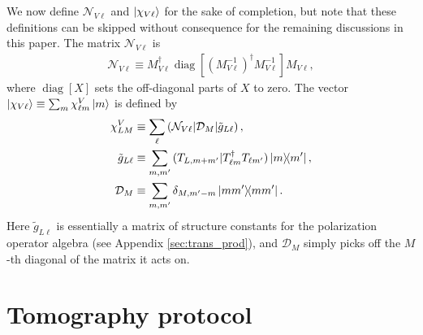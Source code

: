 \documentclass[nofootinbib,twocolumn]{revtex4-1}
\newcommand{\p}[1]{\left(#1\right)} %
\renewcommand{\sp}[1]{\left[#1\right]} %
\newcommand{\D}{\mathcal{D}}
\newcommand{\N}{\mathcal{N}}
\def\obk#1{\mathinner{({#1})}}
\DeclareMathOperator{\diag}{diag}
\begin{document}
We now define $\N_{V\ell}$ and $\ket{\chi_{V\ell}}$ for the sake of completion, but note that these definitions can be skipped without consequence for the remaining discussions in this paper.
The matrix $\N_{V\ell}$ is
\begin{align}
  \N_{V\ell} \equiv M_{V\ell}^\dag
  \diag\sp{\p{M_{V\ell}^{-1}}^\dag M_{V\ell}^{-1}} M_{V\ell},
\end{align}
where $\diag\sp{X}$ sets the off-diagonal parts of $X$ to zero.
The vector $\ket{\chi_{V\ell}}\equiv\sum_m \chi^V_{\ell m} \ket{m}$ is defined by
\begin{align}
  \chi^V_{LM} &\equiv
  \sum_\ell \obk{\N_{V\ell}|\D_M|\tilde g_{L\ell}}, \\
  \tilde g_{L\ell} &\equiv \sum_{m,m'}
  \obk{T_{L,m+m'}|T_{\ell m}^\dag T_{\ell m'}} \op{m}{m'}, \\
  \D_M &\equiv \sum_{m,m'} \delta_{M,m'-m} \op{mm'}.
\end{align}
Here $\tilde g_{L\ell}$ is essentially a matrix of structure constants for the polarization operator algebra (see Appendix \ref{sec:trans_prod}), and $\D_M$ simply picks off the $M$-th diagonal of the matrix it acts on.

\section{Tomography protocol}
\label{sec:protocol}
\end{document}
